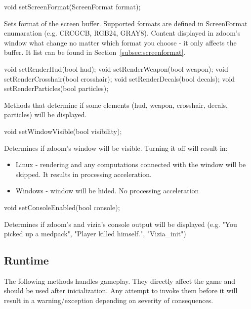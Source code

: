 \vspace{20pt}
\begin{clinee}
 void setScreenFormat(ScreenFormat format);
\end{clinee}

Sets format of the screen buffer. Supported formats are defined in ScreenFormat enumaration (e.g. CRCGCB, RGB24, GRAY8). Content displayed in zdoom's window what change no matter which format you choose - it only affects the buffer. It list can be found in Section~\ref{subsec:screenformat}.


\vspace{20pt}
\begin{clinee}       
void setRenderHud(bool hud);
void setRenderWeapon(bool weapon);
void setRenderCrosshair(bool crosshair);
void setRenderDecals(bool decals);
void setRenderParticles(bool particles);
\end{clinee}

Methods that determine if some elements (hud, weapon, crosshair, decals, particles) will be displayed.


\vspace{20pt}
\begin{clinee}
void setWindowVisible(bool visibility);
\end{clinee}

Determines if zdoom's window will be visible.
Turning it off will result in:
\begin{itemize}
\item Linux - rendering and any computations connected with the window will be skipped. It results in processing acceleration.
\item Windows - window will be hided. No processing acceleration
\end{itemize}


\vspace{20pt}
\begin{clinee}
void setConsoleEnabled(bool console);
\end{clinee}

Determines if zdoom's and vizia's console output will be displayed (e.g. "You picked up a medpack", "Player killed himself.", "Vizia\_init")


\vspace{20pt}
\subsection{Runtime}
The following methods handles gameplay. They directly affect the game and should be used after inicialization. 
Any attempt to invoke them before it will result in a warning/exception depending on severity of consequences. 


